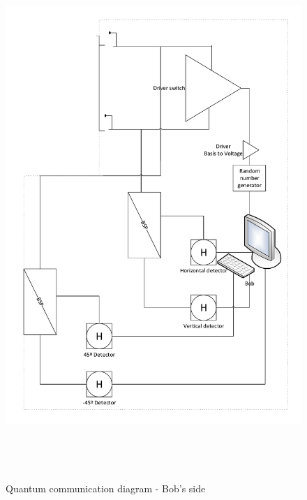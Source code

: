 \begin{figure}[H]
	\centering \includegraphics[width=1.1\textwidth,height=20cm]{./sdf/ot_with_discrete_variables/figures/OT_experimental_bob.pdf}
	\caption{Quantum communication diagram - Bob's side}\label{quantumchannelcommunication2}
\end{figure} 
